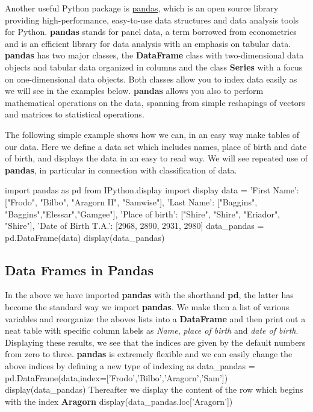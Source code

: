 \documentclass[%
oneside,                 %
final,                   %
10pt]{article}
\begin{document}
\vspace{6mm}



Another useful Python package is
\href{{https://pandas.pydata.org/}}{pandas}, which is an open source library
providing high-performance, easy-to-use data structures and data
analysis tools for Python. \textbf{pandas} stands for panel data, a term borrowed from econometrics and is an efficient library for data analysis with an emphasis on tabular data.
\textbf{pandas} has two major classes, the \textbf{DataFrame} class with two-dimensional data objects and tabular data organized in columns and the class \textbf{Series} with a focus on one-dimensional data objects. Both classes allow you to index data easily as we will see in the examples below. 
\textbf{pandas} allows you also to perform mathematical operations on the data, spanning from simple reshapings of vectors and matrices to statistical operations. 

The following simple example shows how we can, in an easy way make tables of our data. Here we define a data set which includes names, place of birth and date of birth, and displays the data in an easy to read way. We will see repeated use of \textbf{pandas}, in particular in connection with classification of data. 

\bpycod
import pandas as pd
from IPython.display import display
data = {'First Name': ["Frodo", "Bilbo", "Aragorn II", "Samwise"],
        'Last Name': ["Baggins", "Baggins","Elessar","Gamgee"],
        'Place of birth': ["Shire", "Shire", "Eriador", "Shire"],
        'Date of Birth T.A.': [2968, 2890, 2931, 2980]
        }
data_pandas = pd.DataFrame(data)
display(data_pandas)
\epycod


\subsection{Data Frames in Pandas}

In the above we have imported \textbf{pandas} with the shorthand \textbf{pd}, the latter has become the standard way we import \textbf{pandas}. We make then a list of various variables
and reorganize the aboves lists into a \textbf{DataFrame} and then print out  a neat table with specific column labels as \emph{Name}, \emph{place of birth} and \emph{date of birth}.
Displaying these results, we see that the indices are given by the default numbers from zero to three.
\textbf{pandas} is extremely flexible and we can easily change the above indices by defining a new type of indexing as
\bpycod
data_pandas = pd.DataFrame(data,index=['Frodo','Bilbo','Aragorn','Sam'])
display(data_pandas)
\epycod
Thereafter we display the content of the row which begins with the index \textbf{Aragorn}
\bpycod
display(data_pandas.loc['Aragorn'])
\epycod
\end{document}
